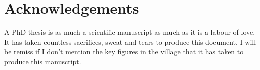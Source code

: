 \chapter*{Acknowledgements}
A PhD thesis is as much a scientific manuscript as much as it is a labour of love. 
It has taken countless sacrifices, sweat and tears to produce this document. I will be remiss if I don't mention the key figures in the village that it has taken to produce this manuscript.